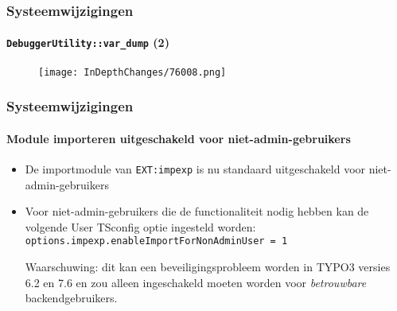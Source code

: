 \begin{frame}[fragile]
	\frametitle{Systeemwijzigingen}
	\framesubtitle{\texttt{DebuggerUtility::var\_dump} (2)}

	\begin{figure}
		\texttt{[image: InDepthChanges/76008.png]}
	\end{figure}

\end{frame}

\begin{frame}[fragile]
	\frametitle{Systeemwijzigingen}
	\framesubtitle{Module importeren uitgeschakeld voor niet-admin-gebruikers}

	\begin{itemize}

		\item De importmodule van \texttt{EXT:impexp} is nu standaard uitgeschakeld voor niet-admin-gebruikers

		\item Voor niet-admin-gebruikers die de functionaliteit nodig hebben kan de volgende User TSconfig optie ingesteld
			worden:\newline
			\texttt{options.impexp.enableImportForNonAdminUser = 1}

			\vspace{0.5cm}

			\begingroup
				\color{typo3red}
				Waarschuwing: dit kan een beveiligingsprobleem worden in TYPO3 versies 6.2 en 7.6
				en zou alleen ingeschakeld moeten worden voor \textit{betrouwbare} backendgebruikers.
			\endgroup

	\end{itemize}

\end{frame}

